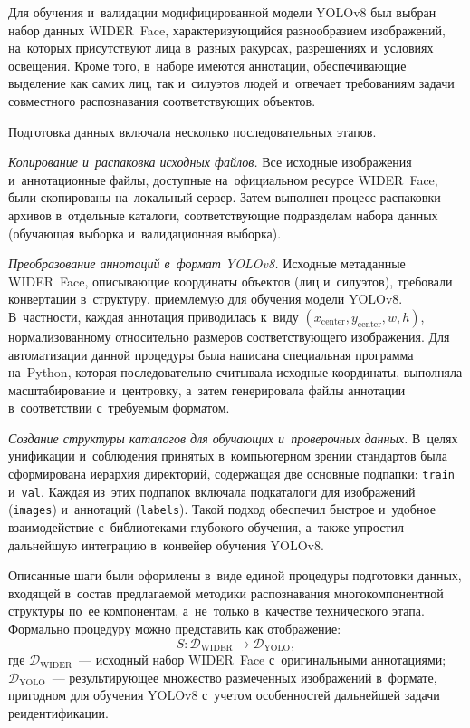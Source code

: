 Для обучения и~валидации модифицированной модели YOLOv8 был выбран
набор данных WIDER~Face, характеризующийся разнообразием
изображений, на~которых присутствуют лица в~разных ракурсах,
разрешениях и~условиях освещения. Кроме того, в~наборе имеются
аннотации, обеспечивающие выделение как самих лиц, так и~силуэтов
людей и~отвечает требованиям задачи совместного
распознавания соответствующих объектов.

Подготовка данных включала несколько последовательных этапов.

\textit{Копирование и~распаковка исходных файлов.} Все исходные
изображения и~аннотационные файлы, доступные на~официальном ресурсе
WIDER~Face, были скопированы на~локальный сервер. Затем выполнен
процесс распаковки архивов в~отдельные каталоги, соответствующие
подразделам набора данных (обучающая выборка и~валидационная выборка).

\textit{Преобразование аннотаций в~формат YOLOv8.} Исходные метаданные
WIDER~Face, описывающие координаты объектов (лиц и~силуэтов),
требовали конвертации в~структуру, приемлемую для обучения модели
YOLOv8. В~частности, каждая аннотация приводилась к~виду
$(x_{\text{center}},y_{\text{center}},w,h)$, нормализованному
относительно размеров соответствующего изображения. Для автоматизации
данной процедуры была написана специальная программа на~Python,
которая последовательно считывала исходные координаты, выполняла
масштабирование и~центровку, а~затем генерировала файлы аннотации
в~соответствии с~требуемым форматом.

\textit{Создание структуры каталогов для обучающих и~проверочных
данных.} В~целях унификации и~соблюдения принятых в~компьютерном
зрении стандартов была сформирована иерархия директорий, содержащая
две основные подпапки: \texttt{train} и~\texttt{val}. Каждая из~этих
подпапок включала подкаталоги для изображений (\texttt{images})
и~аннотаций (\texttt{labels}). Такой подход обеспечил быстрое
и~удобное взаимодействие с~библиотеками глубокого обучения,
а~также упростил дальнейшую интеграцию в~конвейер обучения YOLOv8.

Описанные шаги были оформлены в~виде единой процедуры подготовки
данных, входящей в~состав предлагаемой методики распознавания многокомпонентной структуры по~ее компонентам,
а~не~только в~качестве технического этапа. Формально процедуру можно представить
как отображение:
\begin{equation}\label{eq:ch3/preprocess}
    S\colon\mathcal{D}_{\text{WIDER}}\to\mathcal{D}_{\text{YOLO}},
\end{equation}
где $\mathcal{D}_{\text{WIDER}}$~--- исходный набор WIDER~Face
с~оригинальными аннотациями; $\mathcal{D}_{\text{YOLO}}$~---
результирующее множество размеченных изображений в~формате,
пригодном для обучения YOLOv8 с~учетом особенностей дальнейшей задачи
реидентификации.

